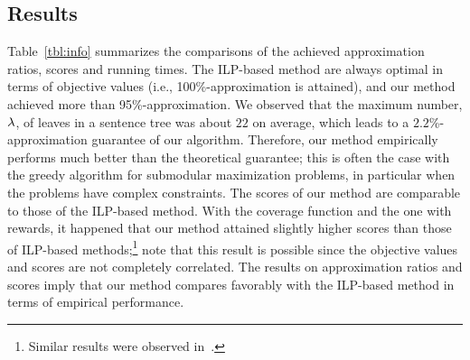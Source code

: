 \documentclass[11pt,a4paper]{article}
\begin{document}
	\subsection{Results}
	Table~\ref{tbl:info} 
	summarizes the comparisons of the achieved approximation ratios, 
	 scores and running times. 
	The ILP-based method are always optimal 
	in terms of objective values (i.e., 100\%-approximation is attained), and our method achieved more than 95\%-approximation. 
	We observed that  
	the maximum number, $\lambda$, of leaves in a sentence tree was about $22$ on average,   
	which leads to a $2.2$\%-approximation guarantee of our algorithm. 
	Therefore, our method empirically performs much better than the theoretical guarantee;  
	this is often the case with the greedy algorithm for submodular maximization problems, 
	in particular when the problems have complex constraints.  
	The  scores of our method are comparable to those of the ILP-based method. 
	With the coverage function and the one with rewards, 
	it happened that our method attained slightly higher  scores 
	than those of ILP-based methods;\footnote{
		Similar results were observed in~\cite{takamura2009cover}.
	} 
	note that this result is possible since the objective values and  scores 
	are not completely 
	correlated. The results on approximation ratios and  scores imply that 
	our method compares favorably with the ILP-based method in terms of empirical performance.
\end{document}

